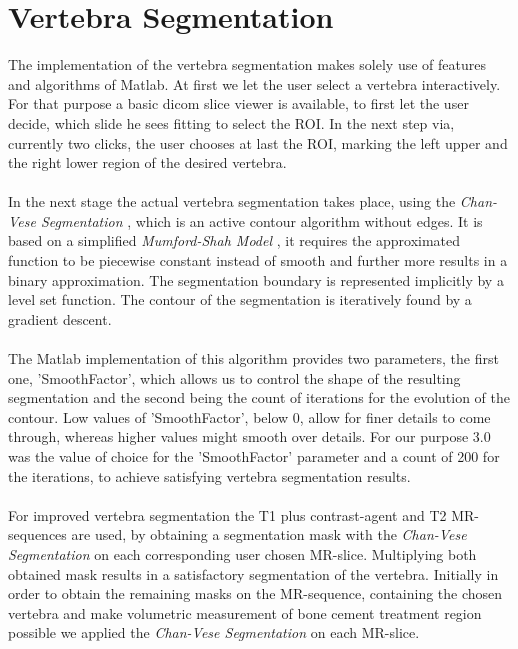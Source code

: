 \documentclass{article}
\begin{document}
  \section{Vertebra Segmentation}
  {
	The implementation of the vertebra segmentation makes solely use of features and algorithms
	of Matlab. At first we let the user select a vertebra interactively. For that purpose a basic 
	dicom slice viewer is available, to first let the user decide, which slide he sees fitting to select the ROI. In the next step via, currently two clicks, the user chooses at last the ROI, marking the left upper and the right lower region of the desired vertebra.\\
	\\In the next stage the actual vertebra segmentation takes place, using the \textit{Chan-Vese Segmentation} \cite{[ChanVese01]}, which is an active contour algorithm without edges. It is based on a simplified \textit{Mumford-Shah Model} \cite{[MumfordShah89]}, it requires the approximated function to be piecewise constant instead of smooth and further more results in a binary approximation. The segmentation boundary is represented implicitly by a level set function. The contour of the segmentation is iteratively found by a gradient descent. \\
	\\ The Matlab implementation of this algorithm provides two parameters, the first one, 'SmoothFactor', which allows us to control the shape of the resulting segmentation and the second being the count of iterations for the evolution of the contour.
	Low values of 'SmoothFactor', below 0, allow for finer details to come through, whereas higher values might smooth over details. For our purpose 3.0 was the value of choice for the 'SmoothFactor' parameter and a count of 200 for the iterations, to achieve satisfying vertebra segmentation results.\\
	\\For improved vertebra segmentation the T1 plus contrast-agent and T2 MR-sequences are used, by obtaining a segmentation mask with the \textit{Chan-Vese Segmentation} \cite{[ChanVese01]} on each corresponding user chosen MR-slice. Multiplying both obtained mask results in a satisfactory segmentation of the vertebra.  
	Initially in order to obtain the remaining masks on the MR-sequence, containing the chosen vertebra and make volumetric measurement of bone cement treatment region possible we applied the \textit{Chan-Vese Segmentation} \cite{[ChanVese01]} on each MR-slice. \newline 
}
\end{document}
